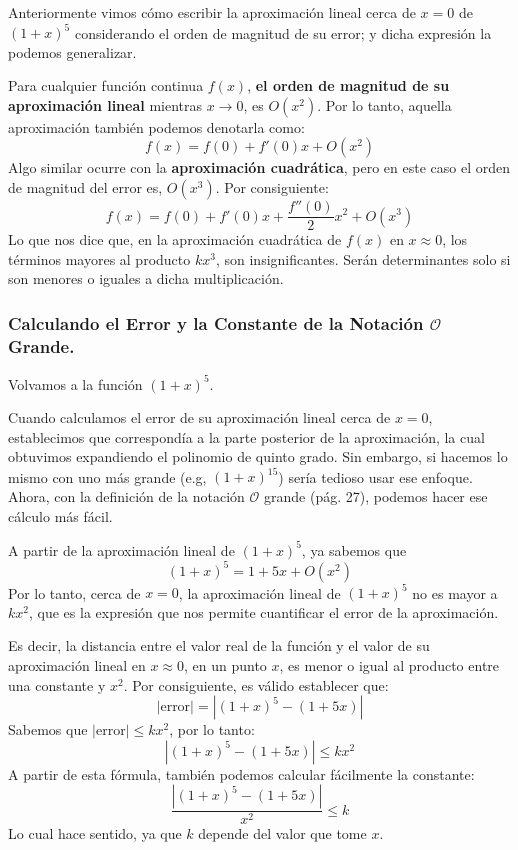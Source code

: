 \documentclass[12pt]{article}
\begin{document}

Anteriormente vimos cómo escribir la aproximación lineal cerca de $x = 0$ de $(1 + x)^{5}$ considerando el orden de magnitud de su error; y dicha expresión la podemos generalizar.

Para cualquier función continua $f(x)$, \textbf{el orden de magnitud de su aproximación lineal} mientras $x \to 0$, es $O(x^{2})$. Por lo tanto, aquella aproximación también podemos denotarla como:
\[f(x) = f(0) + f'(0)x + O(x^{2})\]
Algo similar ocurre con la \textbf{aproximación cuadrática}, pero en este caso el orden de magnitud del error es, $O(x^{3})$. Por consiguiente:
\[f(x) = f(0) + f'(0)x + \frac{f''(0)}{2}x^{2} + O(x^{3})\]
Lo que nos dice que, en la aproximación cuadrática de $f(x)$ en $x \approx 0$, los términos mayores al producto $kx^{3}$, son insignificantes. Serán determinantes solo si son menores o iguales a dicha multiplicación.

\subsubsection{Calculando el Error y la Constante de la Notación $\mathcal{O}$ Grande.}

Volvamos a la función $(1 + x)^{5}$.

Cuando calculamos el error de su aproximación lineal cerca de $x = 0$, establecimos que correspondía a la parte posterior de la aproximación, la cual obtuvimos expandiendo el polinomio de quinto grado. Sin embargo, si hacemos lo mismo con uno más grande (e.g, $(1 + x)^{15}$) sería tedioso usar ese enfoque. Ahora, con la definición de la notación $\mathcal{O}$ grande (pág. 27), podemos hacer ese cálculo más fácil.

A partir de la aproximación lineal de $(1 + x)^{5}$, ya sabemos que
\[(1 + x)^{5} = 1 + 5x + O(x^{2})\]
Por lo tanto, cerca de $x = 0$, la aproximación lineal de $(1 + x)^{5}$ no es mayor a $kx^{2}$, que es la expresión que nos permite cuantificar el error de la aproximación.

Es decir, la distancia entre el valor real de la función y el valor de su aproximación lineal en $x \approx 0$, en un punto $x$, es menor o igual al producto entre una constante y $x^{2}$. Por consiguiente, es válido establecer que:
\[|\text{error}| = |(1 + x)^{5} - (1 + 5x)|\]
Sabemos que $|\text{error}| \leq kx^{2}$, por lo tanto:
\[|(1 + x)^{5} - (1 + 5x)| \leq kx^{2}\]
A partir de esta fórmula, también podemos calcular fácilmente la constante:
\[\frac{|(1 + x)^{5} - (1 + 5x)|}{x^{2}} \leq k\]
Lo cual hace sentido, ya que $k$ depende del valor que tome $x$.
\end{document}
